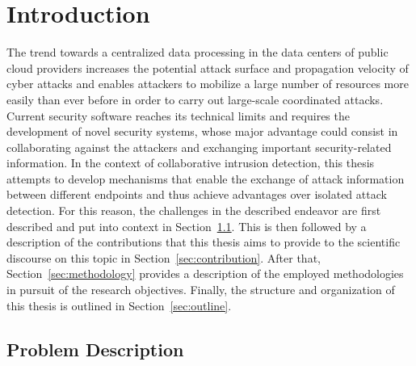 \documentclass[../../main.tex]{subfiles}
\begin{document}
\chapter{Introduction}

The trend towards a centralized data processing in the data centers of public cloud providers increases the potential attack surface and propagation velocity of cyber attacks and enables attackers to mobilize a large number of resources more easily than ever before in order to carry out large-scale coordinated attacks. Current security software reaches its technical limits and requires the development of novel security systems, whose major advantage could consist in collaborating against the attackers and exchanging important security-related information. In the context of collaborative intrusion detection, this thesis attempts to develop mechanisms that enable the exchange of attack information between different endpoints and thus achieve advantages over isolated attack detection. For this reason, the challenges in the described endeavor are first described and put into context in Section~\ref{sec:problem_description}. This is then followed by a description of the contributions that this thesis aims to provide to the scientific discourse on this topic in Section~\ref{sec:contribution}. After that, Section~\ref{sec:methodology} provides a description of the employed methodologies in pursuit of the research objectives. Finally, the structure and organization of this thesis is outlined in Section~\ref{sec:outline}.


\newpage
\section{Problem Description}\label{sec:problem_description}
\end{document}
